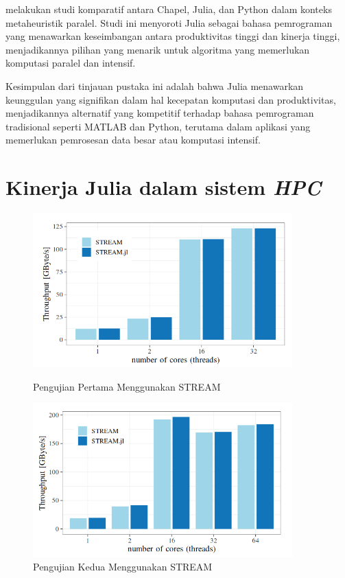 \cite{gmysComparativeStudyHighproductivity2020} melakukan studi komparatif antara
Chapel, Julia, dan Python dalam konteks metaheuristik paralel. Studi ini
menyoroti Julia sebagai bahasa pemrograman yang menawarkan keseimbangan antara
produktivitas tinggi dan kinerja tinggi, menjadikannya pilihan yang menarik untuk
algoritma yang memerlukan komputasi paralel dan intensif.

Kesimpulan dari tinjauan pustaka ini adalah bahwa Julia menawarkan keunggulan yang
signifikan dalam hal kecepatan komputasi dan produktivitas, menjadikannya
alternatif yang kompetitif terhadap bahasa pemrograman tradisional seperti
MATLAB dan Python, terutama dalam aplikasi yang memerlukan pemrosesan data besar
atau komputasi intensif.


\section{Kinerja Julia dalam sistem \emph{HPC}}

\begin{figure}[H]
  \centering
  \includegraphics[width=10cm]{images/stream-1.png}
  \caption{Pengujian Pertama Menggunakan STREAM}
  \label{gambar stream-1}
  \includegraphics[width=10cm]{images/stream-2.png}
  \caption{Pengujian Kedua Menggunakan STREAM}
  \label{gambar stream-2}
\end{figure}

